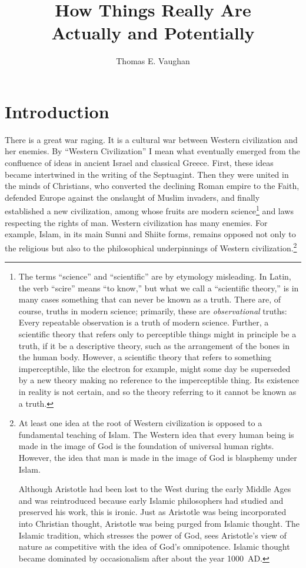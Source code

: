 \documentclass{article}
\title{How Things Really Are\\{\Large Actually and Potentially}}
\author{Thomas E. Vaughan}
\begin{document}
\maketitle

\section{Introduction}

There is a great war raging.  It is a cultural war between Western civilization
and her enemies.  By ``Western Civilization'' I mean what eventually emerged
from the confluence of ideas in ancient Israel and classical Greece.  First,
these ideas became intertwined in the writing of the Septuagint.  Then they
were united in the minds of Christians, who converted the declining Roman
empire to the Faith, defended Europe against the onslaught of Muslim invaders,
and finally established a new civilization, among whose fruits are modern
science\footnote{%
   The terms ``science'' and ``scientific'' are by etymology misleading.  In
   Latin, the verb ``scire'' means ``to know,'' but what we call a ``scientific
   theory,'' is in many cases something that can never be known as a truth.
   There are, of course, truths in modern science; primarily, these are
   \emph{observational} truths: Every repeatable observation is a truth of
   modern science.  Further, a scientific theory that refers only to
   perceptible things might in principle be a truth, if it be a descriptive
   theory, such as the arrangement of the bones in the human body.  However, a
   scientific theory that refers to something imperceptible, like the electron
   for example, might some day be superseded by a new theory making no
   reference to the imperceptible thing.  Its existence in reality is not
   certain, and so the theory referring to it cannot be known as a truth.%
}
and laws respecting the rights of man.  Western civilization has many enemies.
For example, Islam, in its main Sunni and Shiite forms, remains opposed not
only to the religious but also to the philosophical underpinnings of Western
civilization.\footnote{%
   At least one idea at the root of Western civilization is opposed to a
   fundamental teaching of Islam.  The Western idea that every human being is
   made in the image of God is the foundation of universal human rights.
   However, the idea that man is made in the image of God is blasphemy under
   Islam.
   
   Although Aristotle had been lost to the West during the early Middle Ages
   and was reintroduced because early Islamic philosophers had studied and
   preserved his work, this is ironic.  Just as Aristotle was being
   incorporated into Christian thought, Aristotle was being purged from Islamic
   thought.  The Islamic tradition, which stresses the power of God, sees
   Aristotle's view of nature as competitive with the idea of God's
   omnipotence.  Islamic thought became dominated by occasionalism after about
   the year 1000~AD.
}
\end{document}
